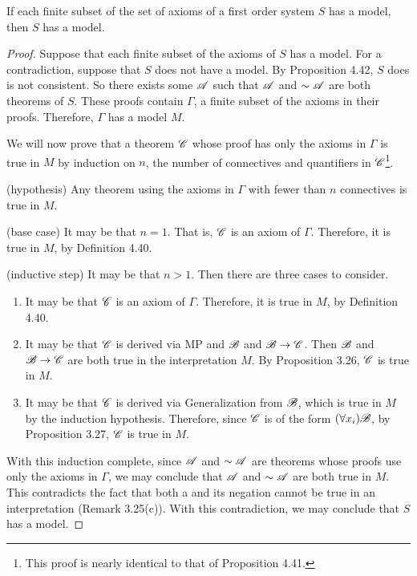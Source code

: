 \begin{proposition}
  If each finite subset of the set of axioms of a first order system \(S\) has a model, then \(S\) has a model.

  \begin{proof}
    Suppose that each finite subset of the axioms of \(S\) has a model. For a contradiction, suppose that \(S\) does not have a model. By Proposition 4.42, \(S\) does is not consistent. So there exists some \wf{} \(\mathscr{A}\) such that \(\mathscr{A}\) and \(\sim\mathscr{A}\) are both theorems of \(S\). These proofs contain \(\Gamma\), a finite subset of the axioms in their proofs. Therefore, \(\Gamma\) has a model \(M\). 

    We will now prove that a theorem \(\mathscr{C}\) whose proof has only the axioms in \(\Gamma\) is true in \(M\) by induction on \(n\), the number of connectives and quantifiers in \(\mathscr{C}\)\footnote{This proof is nearly identical to that of Proposition 4.41.}.

    (hypothesis) Any theorem using the axioms in \(\Gamma\) with fewer than \(n\) connectives is true in \(M\).

    (base case) It may be that \(n=1\). That is, \(\mathscr{C}\) is an axiom of \(\Gamma\). Therefore, it is true in \(M\), by Definition 4.40.

    (inductive step) It may be that \(n>1\). Then there are three cases to consider.
    \begin{enumerate}
      \item It may be that \(\mathscr{C}\) is an axiom of \(\Gamma\). Therefore, it is true in \(M\), by Definition 4.40.

      \item It may be that \(\mathscr{C}\) is derived via MP and \(\mathscr{B}\) and \(\mathscr{B} \rightarrow \mathscr{C}\). Then \(\mathscr{B}\) and \(\mathscr{B} \rightarrow \mathscr{C}\) are both true in the interpretation \(M\). By Proposition 3.26, \(\mathscr{C}\) is true in \(M\).

      \item It may be that \(\mathscr{C}\) is derived via Generalization from \(\mathscr{B}\), which is true in \(M\) by the induction hypothesis. Therefore, since \(\mathscr{C}\) is of the form \((\forall x_i)\mathscr{B}\), by Proposition 3.27, \(\mathscr{C}\) is true in \(M\).
    \end{enumerate}

    With this induction complete, since \(\mathscr{A}\) and \(\sim\mathscr{A}\) are theorems whose proofs use only the axioms in \(\Gamma\), we may conclude that \(\mathscr{A}\) and \(\sim\mathscr{A}\) are both true in \(M\). This contradicts the fact that both a \wf{} and its negation cannot be true in an interpretation (Remark 3.25(c)). With this contradiction, we may conclude that \(S\) has a model.
  \end{proof}
\end{proposition}

